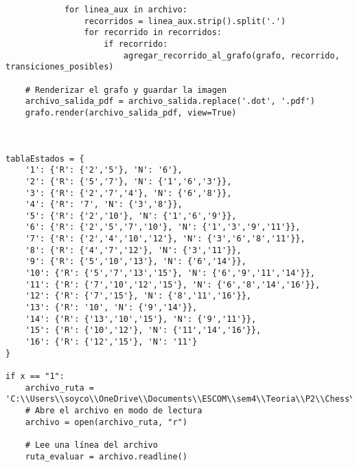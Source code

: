 \begin{lstlisting}
            for linea_aux in archivo:
                recorridos = linea_aux.strip().split('.')
                for recorrido in recorridos:
                    if recorrido:
                        agregar_recorrido_al_grafo(grafo, recorrido, transiciones_posibles)

    # Renderizar el grafo y guardar la imagen
    archivo_salida_pdf = archivo_salida.replace('.dot', '.pdf')
    grafo.render(archivo_salida_pdf, view=True)



tablaEstados = {
    '1': {'R': {'2','5'}, 'N': '6'},
    '2': {'R': {'5','7'}, 'N': {'1','6','3'}},
    '3': {'R': {'2','7','4'}, 'N': {'6','8'}},
    '4': {'R': '7', 'N': {'3','8'}},
    '5': {'R': {'2','10'}, 'N': {'1','6','9'}},
    '6': {'R': {'2','5','7','10'}, 'N': {'1','3','9','11'}},
    '7': {'R': {'2','4','10','12'}, 'N': {'3','6','8','11'}},
    '8': {'R': {'4','7','12'}, 'N': {'3','11'}},
    '9': {'R': {'5','10','13'}, 'N': {'6','14'}},
    '10': {'R': {'5','7','13','15'}, 'N': {'6','9','11','14'}},
    '11': {'R': {'7','10','12','15'}, 'N': {'6','8','14','16'}},
    '12': {'R': {'7','15'}, 'N': {'8','11','16'}},
    '13': {'R': '10', 'N': {'9','14'}},
    '14': {'R': {'13','10','15'}, 'N': {'9','11'}},
    '15': {'R': {'10','12'}, 'N': {'11','14','16'}},
    '16': {'R': {'12','15'}, 'N': '11'}
}

if x == "1":
    archivo_ruta = 'C:\\Users\\soyco\\OneDrive\\Documents\\ESCOM\\sem4\\Teoria\\P2\\Chess\\output\\ruta_blanca.txt'
    # Abre el archivo en modo de lectura
    archivo = open(archivo_ruta, "r")

    # Lee una línea del archivo
    ruta_evaluar = archivo.readline()


\end{lstlisting}
